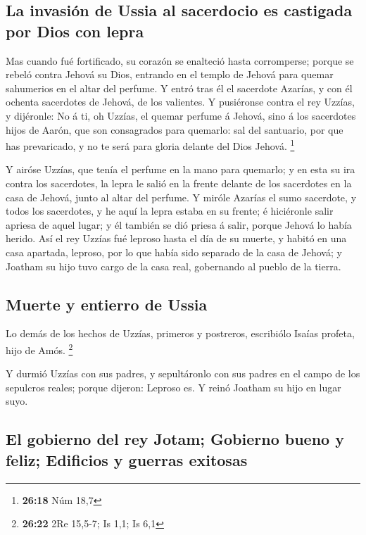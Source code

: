 \hypertarget{la-invasiuxf3n-de-ussia-al-sacerdocio-es-castigada-por-dios-con-lepra}{%
\subsection{La invasión de Ussia al sacerdocio es castigada por Dios con
lepra}\label{la-invasiuxf3n-de-ussia-al-sacerdocio-es-castigada-por-dios-con-lepra}}

 Mas cuando fué fortificado, su corazón se enalteció hasta
corromperse; porque se rebeló contra Jehová su Dios, entrando en el
templo de Jehová para quemar sahumerios en el altar del perfume.
 Y entró tras él el sacerdote Azarías, y con él ochenta
sacerdotes de Jehová, de los valientes.  Y pusiéronse
contra el rey Uzzías, y dijéronle: No á ti, oh Uzzías, el quemar perfume
á Jehová, sino á los sacerdotes hijos de Aarón, que son consagrados para
quemarlo: sal del santuario, por que has prevaricado, y no te será para
gloria delante del Dios Jehová. \footnote{\textbf{26:18} Núm 18,7}

 Y airóse Uzzías, que tenía el perfume en la mano para
quemarlo; y en esta su ira contra los sacerdotes, la lepra le salió en
la frente delante de los sacerdotes en la casa de Jehová, junto al altar
del perfume.  Y miróle Azarías el sumo sacerdote, y todos
los sacerdotes, y he aquí la lepra estaba en su frente; é hiciéronle
salir apriesa de aquel lugar; y él también se dió priesa á salir, porque
Jehová lo había herido.  Así el rey Uzzías fué leproso
hasta el día de su muerte, y habitó en una casa apartada, leproso, por
lo que había sido separado de la casa de Jehová; y Joatham su hijo tuvo
cargo de la casa real, gobernando al pueblo de la tierra.

\hypertarget{muerte-y-entierro-de-ussia}{%
\subsection{Muerte y entierro de
Ussia}\label{muerte-y-entierro-de-ussia}}

 Lo demás de los hechos de Uzzías, primeros y postreros,
escribiólo Isaías profeta, hijo de Amós. \footnote{\textbf{26:22} 2Re
  15,5-7; Is 1,1; Is 6,1}

 Y durmió Uzzías con sus padres, y sepultáronlo con sus
padres en el campo de los sepulcros reales; porque dijeron: Leproso es.
Y reinó Joatham su hijo en lugar suyo.

\hypertarget{el-gobierno-del-rey-jotam-gobierno-bueno-y-feliz-edificios-y-guerras-exitosas}{%
\subsection{El gobierno del rey Jotam; Gobierno bueno y feliz; Edificios
y guerras
exitosas}\label{el-gobierno-del-rey-jotam-gobierno-bueno-y-feliz-edificios-y-guerras-exitosas}}

